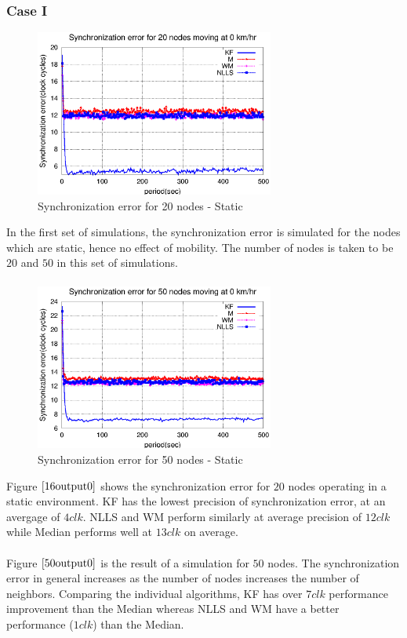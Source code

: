 \documentclass[a4paper,10pt]{report}
\begin{document}
\subsubsection{\textbf{Case I}}
\begin{figure}[!h]
\centering
\includegraphics[width= 0.7\textwidth]{16output-s0}
\caption{Synchronization error for 20 nodes - Static} \label{16output0}
\end{figure}
In the first set of simulations, the synchronization error is simulated for the nodes which are static, hence no effect of mobility. The number of nodes is taken to be $20$ and $50$ in this set of simulations.  \paragraph*{}
\begin{figure}
\centering
\includegraphics[width= 0.7\textwidth]{50output-s0}
\caption{Synchronization error for 50 nodes - Static} \label{50output0}
\end{figure}
Figure $\ref{16output0}$ shows the synchronization error for $20$ nodes operating in a static environment. KF has the lowest precision of synchronization error, at an avergage of $4clk$. NLLS and WM perform similarly at average precision of $12clk$ while Median performs well at $13clk$ on average. \paragraph*{}
Figure $\ref{50output0}$ is the result of a simulation for $50$ nodes. The synchronization error in general increases as the number of nodes increases the number of neighbors. Comparing the individual algorithms, KF has over $7clk$ performance improvement than the Median whereas NLLS and WM have a better performance ($1clk$) than the Median.
\end{document}

